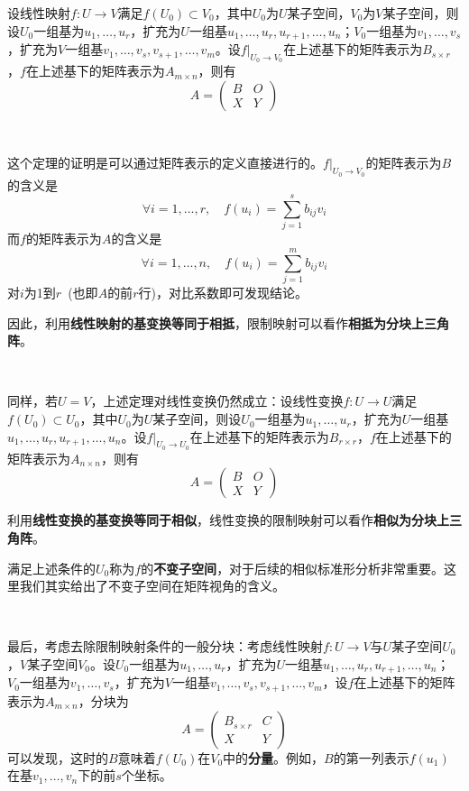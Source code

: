 \documentclass[a4paper,UTF8,fontset=windows]{ctexart}
\newcommand*{\note}{\noindent *}
\begin{document}
设线性映射$f:U\to V$满足$f(U_0)\subset V_0$，其中$U_0$为$U$某子空间，$V_0$为$V$某子空间，则设$U_0$一组基为$u_1,\dots,u_r$，扩充为$U$一组基$u_1,\dots,u_r,u_{r+1},\dots,u_n$；$V_0$一组基为$v_1,\dots,v_s$，扩充为$V$一组基$v_1,\dots,v_s,v_{s+1},\dots,v_m$。设$f\big|_{U_0\to V_0}$在上述基下的矩阵表示为$B_{s\times r}$，$f$在上述基下的矩阵表示为$A_{m\times n}$，则有
$$A=\begin{pmatrix}B&O\\X&Y\end{pmatrix}$$

\

这个定理的证明是可以通过矩阵表示的定义直接进行的。$f\big|_{U_0\to V_0}$的矩阵表示为$B$的含义是
$$\forall i=1,\dots,r,\quad f(u_i)=\sum_{j=1}^sb_{ij}v_i$$
而$f$的矩阵表示为$A$的含义是
$$\forall i=1,\dots,n,\quad f(u_i)=\sum_{j=1}^mb_{ij}v_i$$
对$i$为1到$r$\ (也即$A$的前$r$行)，对比系数即可发现结论。

因此，利用\textbf{线性映射的基变换等同于相抵}，限制映射可以看作\textbf{相抵为分块上三角阵}。

\

同样，若$U=V$，上述定理对线性变换仍然成立：设线性变换$f:U\to U$满足$f(U_0)\subset U_0$，其中$U_0$为$U$某子空间，则设$U_0$一组基为$u_1,\dots,u_r$，扩充为$U$一组基$u_1,\dots,u_r,u_{r+1},\dots,u_n$。设$f\big|_{U_0\to U_0}$在上述基下的矩阵表示为$B_{r\times r}$，$f$在上述基下的矩阵表示为$A_{n\times n}$，则有
$$A=\begin{pmatrix}B&O\\X&Y\end{pmatrix}$$

利用\textbf{线性变换的基变换等同于相似}，线性变换的限制映射可以看作\textbf{相似为分块上三角阵}。

\note 满足上述条件的$U_0$称为$f$的\textbf{不变子空间}，对于后续的相似标准形分析非常重要。这里我们其实给出了不变子空间在矩阵视角的含义。

\

最后，考虑去除限制映射条件的一般分块：考虑线性映射$f:U\to V$与$U$某子空间$U_0$，$V$某子空间$V_0$。设$U_0$一组基为$u_1,\dots,u_r$，扩充为$U$一组基$u_1,\dots,u_r,u_{r+1},\dots,u_n$；$V_0$一组基为$v_1,\dots,v_s$，扩充为$V$一组基$v_1,\dots,v_s,v_{s+1},\dots,v_m$，设$f$在上述基下的矩阵表示为$A_{m\times n}$，分块为
$$A=\begin{pmatrix}B_{s\times r}&C\\X&Y\end{pmatrix}$$
可以发现，这时的$B$意味着$f(U_0)$在$V_0$中的\textbf{分量}。例如，$B$的第一列表示$f(u_1)$在基$v_1,\dots,v_n$下的前$s$个坐标。
\end{document}
